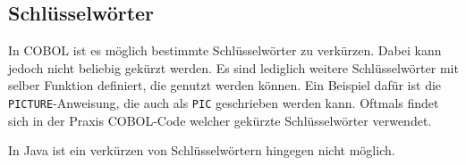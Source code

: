\subsection*{Schlüsselwörter}
In COBOL ist es möglich bestimmte Schlüsselwörter zu verkürzen. Dabei kann jedoch nicht beliebig gekürzt werden. Es sind lediglich weitere Schlüsselwörter mit selber Funktion definiert, die genutzt werden können. Ein Beispiel dafür ist die \texttt{PICTURE}-Anweisung, die auch als \texttt{PIC} geschrieben werden kann. Oftmals findet sich in der Praxis COBOL-Code welcher gekürzte Schlüsselwörter verwendet.

In Java ist ein verkürzen von Schlüsselwörtern hingegen nicht möglich.
